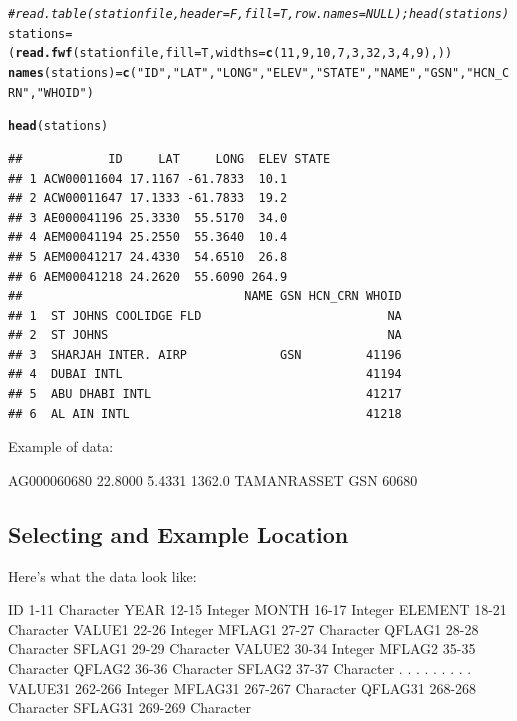 \documentclass{article}\usepackage[]{graphicx}\usepackage[]{color}
\makeatletter
\newcommand{\hlnum}[1]{\textcolor[rgb]{0.686,0.059,0.569}{#1}}%
\newcommand{\hlstr}[1]{\textcolor[rgb]{0.192,0.494,0.8}{#1}}%
\newcommand{\hlcom}[1]{\textcolor[rgb]{0.678,0.584,0.686}{\textit{#1}}}%
\newcommand{\hlstd}[1]{\textcolor[rgb]{0.345,0.345,0.345}{#1}}%
\newcommand{\hlkwb}[1]{\textcolor[rgb]{0.69,0.353,0.396}{#1}}%
\newcommand{\hlkwc}[1]{\textcolor[rgb]{0.333,0.667,0.333}{#1}}%
\newcommand{\hlkwd}[1]{\textcolor[rgb]{0.737,0.353,0.396}{\textbf{#1}}}%
\newenvironment{kframe}{%
 \def\at@end@of@kframe{}%
 \ifinner\ifhmode%
  \def\at@end@of@kframe{\end{minipage}}%
  \begin{minipage}{\columnwidth}%
 \fi\fi%
 \def\FrameCommand##1{\hskip\@totalleftmargin \hskip-\fboxsep
 \colorbox{shadecolor}{##1}\hskip-\fboxsep
     \hskip-\linewidth \hskip-\@totalleftmargin \hskip\columnwidth}%
 \MakeFramed {\advance\hsize-\width
   \@totalleftmargin\z@ \linewidth\hsize
   \@setminipage}}%
 {\par\unskip\endMakeFramed%
 \at@end@of@kframe}
\newenvironment{knitrout}{}{} %
\makeatother
\begin{document}
\begin{knitrout}
\color{fgcolor}\begin{kframe}
\begin{alltt}
\hlcom{# read.table(stationfile, header=F, fill=T, row.names=NULL); head(stations)}
\hlstd{stations} \hlkwb{=} \hlstd{(}\hlkwd{read.fwf}\hlstd{(stationfile,} \hlkwc{fill}\hlstd{=T,} \hlkwc{widths}\hlstd{=} \hlkwd{c}\hlstd{(}\hlnum{11}\hlstd{,} \hlnum{9}\hlstd{,} \hlnum{10}\hlstd{,} \hlnum{7}\hlstd{,} \hlnum{3}\hlstd{,} \hlnum{32}\hlstd{,} \hlnum{3}\hlstd{,} \hlnum{4}\hlstd{,} \hlnum{9}\hlstd{), ))}
\hlkwd{names}\hlstd{(stations)}\hlkwb{=} \hlkwd{c}\hlstd{(}\hlstr{"ID"}\hlstd{,} \hlstr{"LAT"}\hlstd{,} \hlstr{"LONG"}\hlstd{,} \hlstr{"ELEV"}\hlstd{,} \hlstr{"STATE"}\hlstd{,} \hlstr{"NAME"}\hlstd{,} \hlstr{"GSN"}\hlstd{,} \hlstr{"HCN_CRN"}\hlstd{,} \hlstr{"WHOID"}\hlstd{)}

\hlkwd{head}\hlstd{(stations)}
\end{alltt}
\begin{verbatim}
##            ID     LAT     LONG  ELEV STATE
## 1 ACW00011604 17.1167 -61.7833  10.1      
## 2 ACW00011647 17.1333 -61.7833  19.2      
## 3 AE000041196 25.3330  55.5170  34.0      
## 4 AEM00041194 25.2550  55.3640  10.4      
## 5 AEM00041217 24.4330  54.6510  26.8      
## 6 AEM00041218 24.2620  55.6090 264.9      
##                               NAME GSN HCN_CRN WHOID
## 1  ST JOHNS COOLIDGE FLD                          NA
## 2  ST JOHNS                                       NA
## 3  SHARJAH INTER. AIRP             GSN         41196
## 4  DUBAI INTL                                  41194
## 5  ABU DHABI INTL                              41217
## 6  AL AIN INTL                                 41218
\end{verbatim}
\end{kframe}
\end{knitrout}

Example of data:

AG000060680  22.8000    5.4331 1362.0    TAMANRASSET                    GSN     60680        
         

\subsection{Selecting and Example Location}

Here's what the data look like:

ID            1-11   Character
YEAR         12-15   Integer
MONTH        16-17   Integer
ELEMENT      18-21   Character
VALUE1       22-26   Integer
MFLAG1       27-27   Character
QFLAG1       28-28   Character
SFLAG1       29-29   Character
VALUE2       30-34   Integer
MFLAG2       35-35   Character
QFLAG2       36-36   Character
SFLAG2       37-37   Character
  .           .          .
  .           .          .
  .           .          .
VALUE31    262-266   Integer
MFLAG31    267-267   Character
QFLAG31    268-268   Character
SFLAG31    269-269   Character
\end{document}
